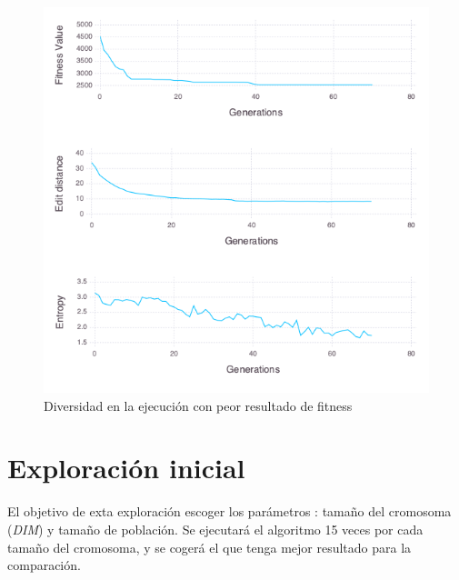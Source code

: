 \begin{figure}[]
	\centering	
	\includegraphics[scale=0.5]{figuras/config_file_1_Rastrigin_worst_f_value.png}
	\caption{ Diversidad en la ejecución con peor resultado de fitness }
    \label{fig:worst_f_value}
\end{figure}

\section{Exploración inicial}

El objetivo de exta exploración escoger los parámetros : tamaño del cromosoma (\textit{DIM}) y tamaño de población. 
Se ejecutará el algoritmo 15 veces por cada tamaño del cromosoma, y se cogerá el que tenga mejor resultado para la comparación.

